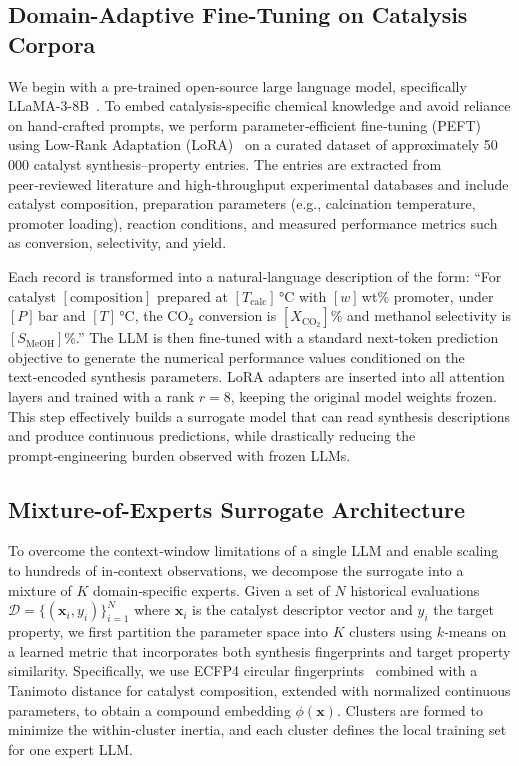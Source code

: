 \documentclass{article}
\begin{document}
\subsection{Domain-Adaptive Fine-Tuning on Catalysis Corpora}
We begin with a pre-trained open-source large language model, specifically LLaMA-3-8B~\cite{touvron2023llama}. To embed catalysis-specific chemical knowledge and avoid reliance on hand‑crafted prompts, we perform parameter‑efficient fine‑tuning (PEFT) using Low‑Rank Adaptation (LoRA)~\cite{hu2022lora} on a curated dataset of approximately 50\,000 catalyst synthesis–property entries. The entries are extracted from peer‑reviewed literature and high‑throughput experimental databases and include catalyst composition, preparation parameters (e.g., calcination temperature, promoter loading), reaction conditions, and measured performance metrics such as conversion, selectivity, and yield.

Each record is transformed into a natural‑language description of the form: ``For catalyst $[\text{composition}]$ prepared at $[T_{\text{calc}}]\,$°C with $[w]\,$wt\% promoter, under $[P]\,$bar and $[T]\,$°C, the CO$_2$ conversion is $[X_{\text{CO}_2}]$\% and methanol selectivity is $[S_{\text{MeOH}}]$\%.'' The LLM is then fine‑tuned with a standard next‑token prediction objective to generate the numerical performance values conditioned on the text‑encoded synthesis parameters. LoRA adapters are inserted into all attention layers and trained with a rank $r=8$, keeping the original model weights frozen. This step effectively builds a surrogate model that can read synthesis descriptions and produce continuous predictions, while drastically reducing the prompt‑engineering burden observed with frozen LLMs.

\subsection{Mixture-of-Experts Surrogate Architecture}
To overcome the context‑window limitations of a single LLM and enable scaling to hundreds of in‑context observations, we decompose the surrogate into a mixture of $K$ domain‑specific experts. Given a set of $N$ historical evaluations $\mathcal{D} = \{(\mathbf{x}_i, y_i)\}_{i=1}^N$ where $\mathbf{x}_i$ is the catalyst descriptor vector and $y_i$ the target property, we first partition the parameter space into $K$ clusters using $k$‑means on a learned metric that incorporates both synthesis fingerprints and target property similarity. Specifically, we use ECFP4 circular fingerprints~\cite{rogers2005extended} combined with a Tanimoto distance for catalyst composition, extended with normalized continuous parameters, to obtain a compound embedding $\phi(\mathbf{x})$. Clusters are formed to minimize the within‑cluster inertia, and each cluster defines the local training set for one expert LLM.
\end{document}
